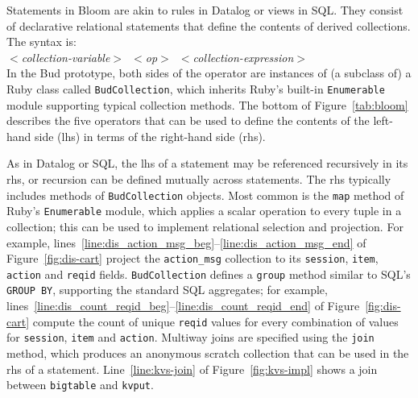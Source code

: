 Statements in Bloom are akin to rules in Datalog or views in SQL.  They consist
of declarative relational statements that define the contents of derived
collections.  The syntax is:\\ \noindent
\mbox{\hspace{0.25in}\emph{$<$collection-variable$>$ $<$op$>$
$<$collection-expression$>$}}\\ \noindent In the Bud prototype, both sides of
the operator are instances of (a subclass of) a Ruby class called
\texttt{BudCollection}, which inherits Ruby's built-in \texttt{Enumerable}
module supporting typical collection methods.  The bottom of Figure~\ref{tab:bloom} describes
the five operators that can be used to define the contents of the left-hand
side (lhs) in terms of the right-hand side (rhs).

As in Datalog or SQL, the lhs of a statement may be referenced recursively in
its rhs, or recursion can be defined mutually across statements.  The rhs
typically includes methods of \texttt{BudCollection} objects.  Most common is
the \texttt{map} method of Ruby's \texttt{Enumerable} module, which applies a
scalar operation to every tuple in a collection; this can be used to implement
relational selection and projection. For example,
lines~\ref{line:dis_action_msg_beg}--\ref{line:dis_action_msg_end} of
Figure~\ref{fig:dis-cart} project the \texttt{action\_msg} collection to
its \texttt{session}, \texttt{item}, \texttt{action} and \texttt{reqid} fields.
\texttt{BudCollection} defines a \texttt{group} method similar to SQL's
\texttt{GROUP BY}, supporting the standard SQL aggregates; for example,
lines~\ref{line:dis_count_reqid_beg}--\ref{line:dis_count_reqid_end} of
Figure~\ref{fig:dis-cart} compute the count of unique \texttt{reqid}
values for every combination of values for \texttt{session}, \texttt{item} and
\texttt{action}.  Multiway joins are specified using the \texttt{join} method,
which produces an anonymous scratch collection that can be used in the
rhs of a statement. Line~\ref{line:kvs-join} of
Figure~\ref{fig:kvs-impl} shows a join between \texttt{bigtable} and
\texttt{kvput}.



